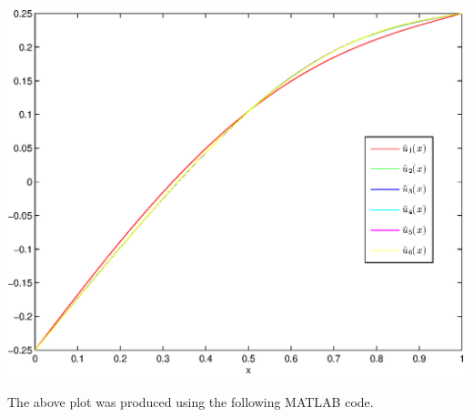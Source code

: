\begin{solution}
\begin{enumerate}
\begin{center}\includegraphics[scale=0.7]{hw26g.eps}\end{center}

The above plot was produced using the following MATLAB code.



\end{enumerate}

\end{solution}


